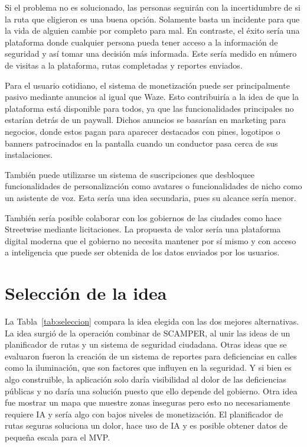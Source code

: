\documentclass[11pt]{article}
\begin{document}
Si el problema no es solucionado, las personas seguirán con la incertidumbre de si la ruta que
eligieron es una buena opción. Solamente basta un incidente para que la vida de alguien cambie por
completo para mal. En contraste, el éxito sería una plataforma donde cualquier persona pueda tener
acceso a la información de seguridad y así tomar una decisión más informada. Este sería medido en
número de visitas a la plataforma, rutas completadas y reportes enviados.

Para el usuario cotidiano, el sistema de monetización puede ser principalmente pasivo mediante
anuncios al igual que Waze. Esto contribuiría a la idea de que la plataforma está disponible para
todos, ya que las funcionalidades principales no estarían detrás de un paywall. Dichos anuncios se
basarían en marketing para negocios, donde estos pagan para aparecer destacados con pines, logotipos
o banners patrocinados en la pantalla cuando un conductor pasa cerca de sus instalaciones.

También puede utilizarse un sistema de suscripciones que desbloquee funcionalidades de
personalización como avatares o funcionalidades de nicho como un asistente de voz. Esta sería una
idea secundaria, pues su alcance sería menor.

También sería posible colaborar con los gobiernos de las ciudades como hace Streetwise mediante
licitaciones. La propuesta de valor sería una plataforma digital moderna que el gobierno no necesita
mantener por sí mismo y con acceso a inteligencia que puede ser obtenida de los datos enviados por
los usuarios.

\section{Selección de la idea}
\label{sec:seleccion}

La Tabla~\ref{tab:seleccion} compara la idea elegida con las dos mejores alternativas. La idea surgió
de la operación combinar de SCAMPER, al unir las ideas de un planificador de rutas y un sistema de
seguridad ciudadana. Otras ideas que se evaluaron fueron la creación de un sistema de reportes para
deficiencias en calles como la iluminación, que son factores que influyen en la seguridad. Y si bien
es algo construible, la aplicación solo daría visibilidad al dolor de las deficiencias públicas y no
daría una solución puesto que ello depende del gobierno. Otra idea fue mostrar un mapa que muestre
zonas inseguras pero esto no necesariamente requiere IA y sería algo con bajos niveles de
monetización. El planificador de rutas seguras soluciona un dolor, hace uso de IA y es posible
obtener datos de pequeña escala para el MVP.
\end{document}
